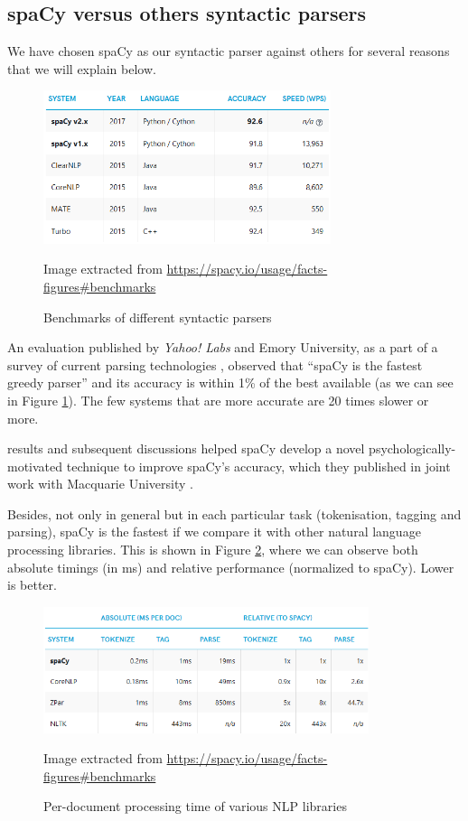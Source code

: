 \subsection{spaCy versus others syntactic parsers}

We have chosen spaCy as our syntactic parser against others for several reasons that we will explain below.

\begin{figure}[h]
	\centering%
	\includegraphics[width = 0.75\textwidth]{Imagenes/Bitmap/Spacy/spacyeval.png}%
	\caption{Benchmarks of different syntactic parsers}%
	Image extracted from \url{https://spacy.io/usage/facts-figures#benchmarks}
	\label{fig:spacyeval}
\end{figure}

An evaluation published by \textit{Yahoo! Labs} and Emory University, as a part of a survey of current parsing technologies \citep{choi2015depends}, observed that ``spaCy is the fastest greedy parser'' and its accuracy is within 1\% of the best available (as we can see in Figure \ref{fig:spacyeval}). The few systems that are more accurate are 20 times slower or more.

\cite{choi2015depends} results and subsequent discussions helped spaCy develop a novel psychologically-motivated technique to improve spaCy's accuracy, which they published in joint work with Macquarie University \citep{honnibal2015improved}.

Besides, not only in general but in each particular task (tokenisation, tagging and parsing), spaCy is the fastest if we compare it with other natural language processing libraries. This is shown in Figure \ref{fig:spacyspeed}, where we can observe both absolute timings (in ms) and relative performance (normalized to spaCy). Lower is better.

\begin{figure}[h]
	\centering%
	\includegraphics[width = 0.85\textwidth]{Imagenes/Bitmap/Spacy/spacyspeed.png}%
	\caption{Per-document processing time of various NLP libraries}%
	Image extracted from \url{https://spacy.io/usage/facts-figures#benchmarks}
	\label{fig:spacyspeed}
\end{figure}

